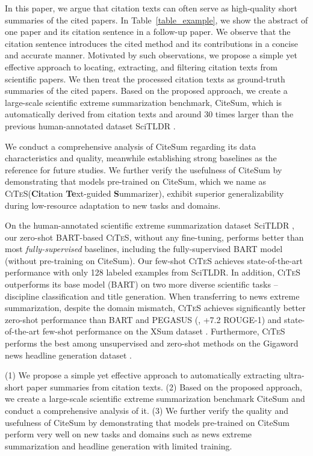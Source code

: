 \documentclass[11pt]{article}
\newcommand{\ours}{\textsc{CiTeS}\xspace}
\newcommand{\ourdata}{CiteSum\xspace}
\begin{document}
In this paper, we argue that citation texts can often serve as high-quality short summaries of the cited papers.
In Table~\ref{table_example}, we show the abstract of one paper and its citation sentence in a follow-up paper.
We observe that the citation sentence introduces the cited method and its contributions in a concise and accurate manner.
Motivated by such observations, we propose a simple yet effective approach to locating, extracting, and filtering citation texts from scientific papers.
We then treat the processed citation texts as ground-truth summaries of the cited papers.
Based on the proposed approach, we create a large-scale scientific extreme summarization benchmark, \ourdata,  which is automatically derived from citation texts and around 30 times larger than the previous human-annotated dataset SciTLDR \cite{cachola-etal-2020-tldr}.

We conduct a comprehensive analysis of \ourdata regarding its data characteristics and quality, meanwhile establishing strong baselines as the reference for future studies.
We further verify the usefulness of \ourdata by demonstrating that models pre-trained on \ourdata, which we name as \ours (\textbf{Ci}tation \textbf{Te}xt-guided \textbf{S}ummarizer), exhibit superior generalizability during low-resource adaptation to new tasks and domains.

On the human-annotated scientific extreme summarization dataset SciTLDR \cite{cachola-etal-2020-tldr}, our zero-shot BART-based \cite{lewis-etal-2020-bart} \ours, without any fine-tuning, performs better than most \textit{fully-supervised} baselines, including the fully-supervised BART model (without pre-training on \ourdata).
Our few-shot \ours achieves state-of-the-art performance with only 128 labeled examples from SciTLDR.
In addition, \ours outperforms its base model (BART) on two more diverse scientific tasks -- discipline classification and title generation.
When transferring to news extreme summarization, despite the domain mismatch, \ours achieves significantly better zero-shot performance than BART and PEGASUS \cite{zhang2020pegasus} (\eg, +7.2 ROUGE-1) and state-of-the-art few-shot performance on the XSum dataset \cite{narayan-etal-2018-dont}.
Furthermore, \ours performs the best among unsupervised and zero-shot methods on the Gigaword news headline generation dataset  \cite{rush-etal-2015-neural}. 



(1) We propose a simple yet effective approach to automatically extracting ultra-short paper summaries from citation texts.
(2) Based on the proposed approach, we create a large-scale scientific extreme summarization benchmark \ourdata and conduct a comprehensive analysis of it.
(3) We further verify the quality and usefulness of \ourdata by demonstrating that models pre-trained on \ourdata perform very well on new tasks and domains such as news extreme summarization and headline generation with limited training.
\end{document}
